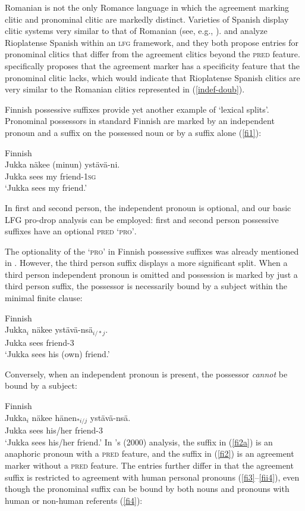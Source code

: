 \documentclass[output=paper,hidelinks]{langscibook}
\begin{document}
 Romanian is not the only Romance language in which the agreement marking clitic and pronominal clitic are markedly distinct.  Varieties of Spanish display clitic systems very similar to that of Romanian (see, e.g., \citealt{mayer17}). \citet{Andrews90}  and  \citet{Estigarribia2013}      analyze Rioplatense Spanish within an \textsc{lfg} framework, and they both propose entries for pronominal clitics that differ from the agreement clitics beyond the \textsc{pred} feature.  \citeauthor{Estigarribia2013} specifically proposes that the agreement marker  has   a specificity  feature that the pronominal clitic lacks, which would indicate that   Rioplatense Spanish clitics  are very  similar to the Romanian clitics  represented in  (\ref{indef-doub}). 
 
Finnish possessive suffixes  provide  yet another example of `lexical splits'.  Pro\-nom\-i\-nal possessors in  standard Finnish are marked by an independent pronoun and a suffix on the possessed noun or by  a suffix alone (\ref{fi1}):

\ea \label{fi1} Finnish\\
\gll Jukka n\"{a}kee  (minun) yst\"{a}v\"{a}-ni. \\
Jukka sees  { }my friend-1\textsc{sg}    \\
 \glt `Jukka  sees my   friend.'
\z
 
In first and second person, the independent pronoun is optional, and our basic LFG pro-drop analysis can be employed:  first and second person possessive suffixes have an optional \textsc{pred} \textsc{`pro'}.

The optionality of the \PRED \textsc{`pro'} in Finnish possessive suffixes was already mentioned in .  However, the third person suffix displays a more significant split.  When a third person independent pronoun is  omitted and possession is marked by just a third person suffix, the possessor is necessarily bound by a subject within the minimal finite clause:

\ea  \label{fi2a}Finnish\\
\gll  Jukka$_i$ n\"{a}kee  yst\"{a}v\"{a}-ns\"{a}$_{i/*j}$. \\
  Jukka sees  friend-3    \\ 
\glt `Jukka sees his (own) friend.'
\z

  Conversely, when an independent pronoun is present, the possessor \textit{cannot} be bound by a subject:
  
  \ea \label{fi2}Finnish\\
  \gll Jukka$_i$ n\"{a}kee h\"{a}nen$_{*i/j}$ yst\"{a}v\"{a}-ns\"{a}. \\
Jukka sees his/her friend-3   \\
  \glt `Jukka sees his/her friend.'
  \z
In  \citeauthor{Toivonen:FinnPoss}'s (2000) analysis,  the suffix  in (\ref{fi2a}) is an anaphoric pronoun with  a \textsc{pred} feature, and  the   suffix  in (\ref{fi2})  is an agreement marker without a \textsc{pred} feature. The   entries further  differ in that the agreement suffix is restricted to agreement with human personal pronouns (\ref{fi3}--\ref{fii4}), even though the pronominal suffix can be bound by   both nouns and pronouns with human or non-human referents (\ref{fi4}):
\end{document}
